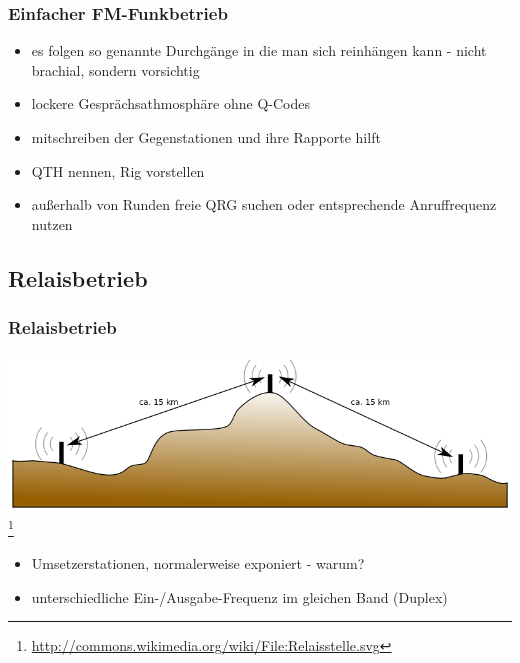 \begin{frame}
    \frametitle{Einfacher FM-Funkbetrieb}

    \begin{itemize}[<+->]
        \item es folgen so genannte Durchgänge in die man sich reinhängen kann -
              nicht brachial, sondern vorsichtig
        \item lockere Gesprächsathmosphäre ohne Q-Codes
        \item mitschreiben der Gegenstationen und ihre Rapporte hilft
        \item QTH nennen, Rig vorstellen
        \item außerhalb von Runden freie QRG suchen oder entsprechende
              Anruffrequenz nutzen
    \end{itemize}

\end{frame}

\subsection{Relaisbetrieb}

\begin{frame}
    \frametitle{Relaisbetrieb}

    \begin{center}
        \includegraphics[width=1\textwidth]{bv11/Relaisstelle.png}
        \footnote{\tiny \url{http://commons.wikimedia.org/wiki/File:Relaisstelle.svg}}
    \end{center}

    \begin{itemize}
        \item Umsetzerstationen, normalerweise exponiert - warum?
        \item unterschiedliche Ein-/Ausgabe-Frequenz im gleichen Band (Duplex)
    \end{itemize}

\end{frame}

